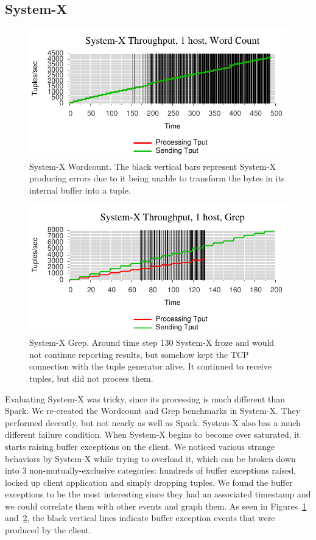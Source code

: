 \subsection{System-X}
\label{ssec:sysx1}

\begin{figure}[t]
\centering
\includegraphics[width=1\linewidth]{figures/sb1_tput.pdf}
\caption{System-X Wordcount. The black vertical bars represent System-X producing errors due to it being unable to transform the bytes in its internal buffer into a tuple.}
\label{fig:sb1-tput}
\end{figure}

\begin{figure}[t]
\centering
\includegraphics[width=1\linewidth]{figures/sb2_tput.pdf}
\caption{System-X Grep. Around time step 130 System-X froze and would not continue reporting results, but somehow kept the TCP connection with the tuple generator alive.  It continued to receive tuples, but did not process them.}
\label{fig:sb2-tput}
\end{figure}

Evaluating System-X was tricky, since its processing is much different than
Spark. We re-created the Wordcount and Grep benchmarks in System-X.  They
performed decently, but not nearly as well as Spark. System-X also has a much
different failure condition. When System-X begins to become over saturated, it
starts raising buffer exceptions on the client. We noticed various strange behaviors
by System-X while trying to overload it, which can be broken down into 3
non-mutually-exclusive categories: hundreds of buffer exceptions raised, locked
up client application and simply dropping tuples. We found the buffer
exceptions to be the most interesting since they had an associated timestamp
and we could correlate them with other events and graph them. As seen in 
Figures~\ref{fig:sb1-tput} and~\ref{fig:sb2-tput}, the black vertical lines
indicate buffer exception events that were produced by the client.

